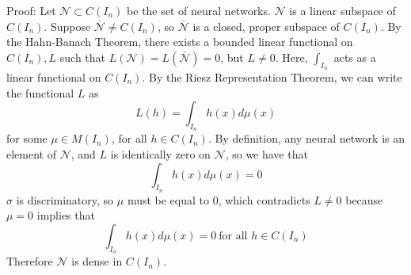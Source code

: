 \documentclass[12 pt]{article}
\theoremstyle{definition}
\begin{document}
Proof: Let $\mathcal{N} \subset C(I_{n})$ be the set of neural networks. $\mathcal{N}$ is a linear subspace of $C(I_{n})$. Suppose $\overline{\mathcal{N}} \neq C(I_{n})$, so $\overline{\mathcal{N}}$ is a closed, proper subspace of $C(I_{n})$. By the Hahn-Banach Theorem, there exists a bounded linear functional on $C(I_{n}), L$ such that $L(\mathcal{N}) = L(\overline{\mathcal{N}}) = 0$, but $L \neq 0$. Here, $\int_{I_{n}}$ acts as a linear functional on $C(I_{n})$. By the Riesz Representation Theorem, we can write the functional $L$ as 
\begin{equation*}
L(h) = \int_{I_{n}} h(x) d \mu(x) 
\end{equation*}
for some $\mu \in M(I_{n})$, for all $h \in C(I_{n})$. By definition, any neural network is an element of $\mathcal{N}$, and $L$ is identically zero on $\mathcal{N}$, so we have that 
\begin{equation*}
\int_{I_{n}} h(x) d \mu(x) = 0 
\end{equation*}
$\sigma$ is discriminatory, so $\mu$ must be equal to $0$, which contradicts $L \neq 0$ because $\mu = 0$ implies that 
\begin{equation*}
\int_{I_{n}} h(x)d \mu(x) = 0 \ \text{for all $h \in C(I_{n})$}
\end{equation*}
Therefore $\mathcal{N}$ is dense in $C(I_{n})$. 

\

\hspace*{\fill}\qedsymbol
\end{document}
